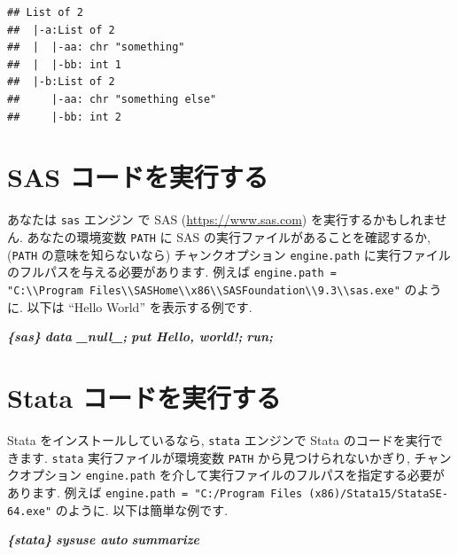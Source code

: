 \documentclass[
  11pt,
]{bxjsreport}
\newenvironment{Shaded}{\begin{snugshade}}{\end{snugshade}}
\newcommand{\InformationTok}[1]{\textcolor[rgb]{0.56,0.35,0.01}{\textbf{\textit{#1}}}}
\begin{document}
\begin{verbatim}
## List of 2
##  |-a:List of 2
##  |  |-aa: chr "something"
##  |  |-bb: int 1
##  |-b:List of 2
##     |-aa: chr "something else"
##     |-bb: int 2
\end{verbatim}

\hypertarget{eng-sas}{%
\section{SAS コードを実行する}\label{eng-sas}}

あなたは \texttt{sas} エンジン で SAS (\url{https://www.sas.com}) を実行するかもしれません. あなたの環境変数 \texttt{PATH} に SAS の実行ファイルがあることを確認するか, (\texttt{PATH} の意味を知らないなら) チャンクオプション \texttt{engine.path} に実行ファイルのフルパスを与える必要があります. 例えば \texttt{engine.path = "C:\textbackslash{}\textbackslash{}Program\ Files\textbackslash{}\textbackslash{}SASHome\textbackslash{}\textbackslash{}x86\textbackslash{}\textbackslash{}SASFoundation\textbackslash{}\textbackslash{}9.3\textbackslash{}\textbackslash{}sas.exe"} のように. 以下は ``Hello World'' を表示する例です.

\begin{Shaded}
\begin{Highlighting}[]
\InformationTok{\textasciigrave{}\textasciigrave{}\textasciigrave{}\{sas\}}
\InformationTok{data \_null\_;}
\InformationTok{put \textquotesingle{}Hello, world!\textquotesingle{};}
\InformationTok{run;}
\InformationTok{\textasciigrave{}\textasciigrave{}\textasciigrave{}}
\end{Highlighting}
\end{Shaded}

\hypertarget{eng-stata}{%
\section{Stata コードを実行する}\label{eng-stata}}

Stata をインストールしているなら, \texttt{stata} エンジンで Stata のコードを実行できます. \texttt{stata} 実行ファイルが環境変数 \texttt{PATH} から見つけられないかぎり, チャンクオプション \texttt{engine.path} を介して実行ファイルのフルパスを指定する必要があります. 例えば \texttt{engine.path = "C:/Program Files (x86)/Stata15/StataSE-64.exe"} のように. 以下は簡単な例です.

\begin{Shaded}
\begin{Highlighting}[]
\InformationTok{\textasciigrave{}\textasciigrave{}\textasciigrave{}\{stata\}}
\InformationTok{sysuse auto}
\InformationTok{summarize}
\InformationTok{\textasciigrave{}\textasciigrave{}\textasciigrave{}}
\end{Highlighting}
\end{Shaded}
\end{document}
